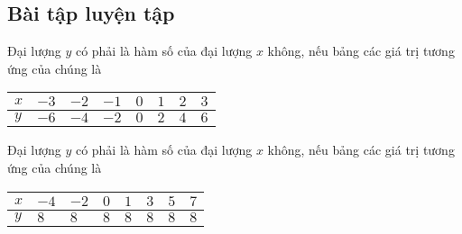 \subsection{Bài tập luyện tập}
\begin{bt}%
Đại lượng $y$ có phải là hàm số của đại lượng $x$ không, nếu bảng các giá trị tương ứng của chúng là
\begin{center}
 \begin{tabular}{|>{\centering\arraybackslash}p{2cm}|>{\centering\arraybackslash}p{1cm}|>{\centering\arraybackslash}p{1cm}|>{\centering\arraybackslash}p{1cm}|>{\centering\arraybackslash}p{1cm}|>{\centering\arraybackslash}p{1cm}|>{\centering\arraybackslash}p{1cm}|>{\centering\arraybackslash}p{1cm}|}
\hline 
$x$ & $-3$ & $-2$ & $-1$ & $0$ & $1$ & $2$ & $3$ \\ 
\hline 
$y$ & $-6$ & $-4$ & $-2$ & $0$ & $2$ & $4$ & $6$ \\ 
\hline 
\end{tabular}
 \end{center} 
\end{bt}
\begin{bt}%
Đại lượng $y$ có phải là hàm số của đại lượng $x$ không, nếu bảng các giá trị tương ứng của chúng là
\begin{center}
\begin{tabular}{|>{\centering\arraybackslash}p{2cm}|>{\centering\arraybackslash}p{1cm}|>{\centering\arraybackslash}p{1cm}|>{\centering\arraybackslash}p{1cm}|>{\centering\arraybackslash}p{1cm}|>{\centering\arraybackslash}p{1cm}|>{\centering\arraybackslash}p{1cm}|>{\centering\arraybackslash}p{1cm}|}
\hline 
$x$ & $-4$ & $-2$ & $0$ & $1$ & $3$ & $5$ & $7$ \\ 
\hline 
$y$ & $8$ & $8$ & $8$ & $8$ & $8$ & $8$ & $8$ \\ 
\hline 
\end{tabular} 
\end{center}
\end{bt}
